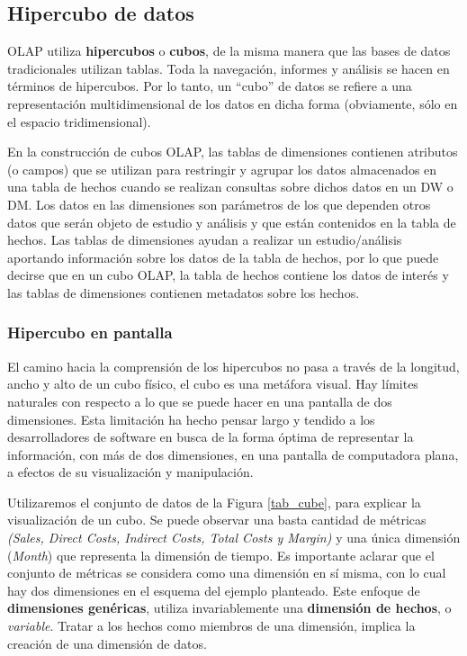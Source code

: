 \documentclass[a4paper,11pt]{article}
\begin{document}
    
    \subsection{Hipercubo de datos}
    
    OLAP utiliza \textbf{hipercubos} o \textbf{cubos}, de la misma manera que las bases de datos tradicionales utilizan tablas.
    Toda la navegación, informes y análisis se hacen en términos de hipercubos.
    Por lo tanto, un ``cubo'' de datos se refiere a una representación multidimensional de los datos en dicha forma (obviamente, sólo en el espacio tridimensional).
    
    En la construcción de cubos OLAP, las tablas de dimensiones contienen atributos (o campos) que se utilizan para restringir y agrupar
    los datos almacenados en una tabla de hechos cuando se realizan consultas sobre dichos datos en un DW o DM. Los datos en las dimensiones son parámetros
    de los que dependen otros datos que serán objeto de estudio y análisis y que están contenidos en la tabla de hechos. Las tablas de dimensiones ayudan a
    realizar un estudio/análisis aportando información sobre los datos de la tabla de hechos, por lo que puede decirse que en un cubo OLAP, la tabla de
    hechos contiene los datos de interés y las tablas de dimensiones contienen metadatos sobre los hechos.


    \subsubsection{Hipercubo en pantalla}

    El camino hacia la comprensión de los hipercubos no pasa a través de la longitud, ancho y alto de un cubo físico, el cubo es una metáfora visual. Hay
    límites naturales con respecto a lo que se puede hacer en una pantalla de dos dimensiones. Esta limitación ha hecho pensar largo y tendido a los
    desarrolladores de software en busca de la forma óptima de representar la información, con más de dos dimensiones, en una pantalla de computadora plana,
    a efectos de su visualización y manipulación.
    
    Utilizaremos el conjunto de datos de la Figura \ref{tab_cube}, para explicar la visualización de un cubo. Se puede observar una basta cantidad de
    métricas \textit{(Sales, Direct Costs, Indirect Costs, Total Costs y Margin)} y una única dimensión (\textit{Month}) que representa la dimensión de tiempo.
    Es importante aclarar que el conjunto de métricas se considera como una dimensión en sí misma, con lo cual hay dos dimensiones en el esquema del ejemplo planteado.
    Este enfoque de \textbf{dimensiones genéricas}, utiliza invariablemente una \textbf{dimensión de hechos}, o \textit{variable}.
    Tratar a los hechos como miembros de una dimensión, implica la creación de una dimensión de datos. 
    
\end{document}

